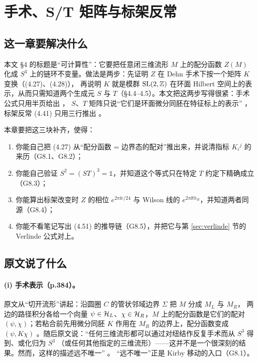 \section{手术、S/T 矩阵与标架反常}\label{sec:surgery}

\subsection{这一章要解决什么}

本文 \S4 的标题是“可计算性”：它要把任意闭三维流形 $M$ 上的配分函数 $Z(M)$ 化成 $S^3$
上的链环不变量。做法是两步：先证明 $Z$ 在 Dehn 手术下按一个矩阵 $K$ 变换（(4.27)、(4.28)），
再说明 $K$ 就是模群 $\mathrm{SL}(2,\mathbb{Z})$ 在环面 Hilbert 空间上的表示，从而只需知道两个生成元
$S$ 与 $T$（\S4.4--4.5）。本文把这两步写得很紧：手术公式只用半页给出 ，
$S$、$T$ 矩阵只说“它们是环面微分同胚在特征标上的表示” ，
标架反常 (4.41) 只用三行推出 。

本章要把这三块补齐，使得：
\begin{enumerate}[leftmargin=2em]
\item 你能自己把 (4.27) 从“配分函数 = 边界态的配对”推出来，并说清指标 $K_i{}^j$ 的来历（G8.1、G8.2）；
\item 你能自己验证 $S^2=(ST)^3=\mathbb 1$，并知道这个等式只在特定 $T$ 约定下精确成立（G8.3）；
\item 你能算出标架改变时 $Z$ 的相位 $e^{2\pi\ii c/24}$ 与 Wilson 线的 $e^{2\pi\ii t h_R}$，并知道两者同源（G8.4）；
\item 你能不看笔记写出 (4.51) 的推导链（G8.5），并把它与第 \ref{sec:verlinde} 节的 Verlinde 公式对上。
\end{enumerate}

\subsection{原文说了什么}

\paragraph{(i) 手术表示（p.384）。}
原文从“切开流形”讲起：沿圆圈 $C$ 的管状邻域边界 $\Sigma$ 把 $M$ 分成 $M_L$ 与 $M_R$，
两边的路径积分各给一个向量 $\psi\in\mathcal{H}_L$、$\chi\in\mathcal{H}_R$，$M$ 上的配分函数是它们的配对
$(\psi,\chi)$；若粘合前先用微分同胚 $K$ 作用在 $M_R$ 的边界上，配分函数变成 $(\psi,K\chi)$
。随后原文说：“任何三维流形都可以通过对纽结作反复手术而从 $S^3$ 得到、或化归为 $S^3$
（或任何其他指定的三维流形）——这并不是一个很深刻的结果。然而，这样的描述远不唯一” 。
“远不唯一”正是 Kirby 移动的入口（G8.1）。

